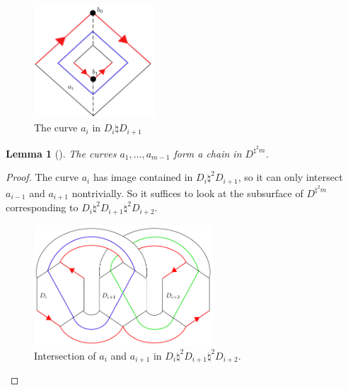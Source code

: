 \documentclass[reqno]{amsart}
\newtheorem{lemma}[theorem]{Lemma}
\theoremstyle{definition}
\theoremstyle{remark}
\begin{document}
\begin{figure}[H]
    \centering
    \includegraphics[width=0.4\textwidth]{curvem2.png}
    \caption{The curve $a_i$ in $D_i \natural D_{i+1}$
    \cite[Figure 4]{Harr-Vistrup-Wahl}}
    \label{fig:curve-m-2-png}
\end{figure}

\begin{lemma}[]
    The curves $a_1, \ldots, a_{m-1}$ form a chain in
    $D^{\natural^2 m}$.
\end{lemma}

\begin{proof}
    The curve $a_i$ has image contained in $D_i \natural^2 D_{i+1}$,
    so it can only intersect $a_{i-1}$ and $a_{i+1}$ nontrivially.
    So it suffices to look at the subsurface of
    $D^{\natural^2 m}$ corresponding to
    $D_i \natural^2 D_{i+1} \natural^2 D_{i+2}$.

    \begin{figure}[H]
        \centering
        \includegraphics[width=0.6\textwidth]{intersection-a_is.png}
        \caption{Intersection of
        $a_i$ and $a_{i+1}$ in
    $D_i \natural^2 D_{i+1} \natural^2 D_{i+2}$.
\cite[Figure 5]{Harr-Vistrup-Wahl}}
        \label{fig:intersection-a_is-png}
    \end{figure}
\end{proof}
\end{document}
